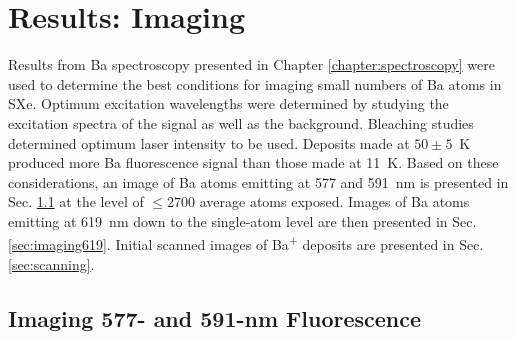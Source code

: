 \chapter{Results: Imaging}
\label{chapter:imaging}


Results from Ba spectroscopy presented in Chapter \ref{chapter:spectroscopy} were used to determine the best conditions for imaging small numbers of Ba atoms in SXe.  Optimum excitation wavelengths were determined by studying the excitation spectra of the signal as well as the background.  Bleaching studies determined optimum laser intensity to be used.  Deposits made at $50 \pm 5$~K produced more Ba fluorescence signal than those made at 11~K.  Based on these considerations, an image of Ba atoms emitting at 577 and 591~nm is presented in Sec. \ref{sec:imaging590and577} at the level of $\leq 2700$ average atoms exposed. Images of Ba atoms emitting at 619~nm down to the single-atom level are then presented in Sec. \ref{sec:imaging619}.  Initial scanned images of Ba\textsuperscript{+} deposits are presented in Sec. \ref{sec:scanning}.






\section{Imaging 577- and 591-nm Fluorescence}
\label{sec:imaging590and577}

